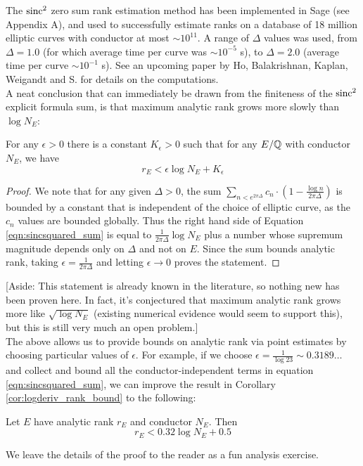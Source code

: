 The $\text{sinc}^2$ zero sum rank estimation method has been implemented in Sage (see Appendix A), and used to successfully estimate ranks on a database of 18 million elliptic curves with conductor at most $\sim 10^{11}$. A range of $\Delta$ values was used, from $\Delta=1.0$ (for which average time per curve was $\sim 10^{-5}$ s), to $\Delta=2.0$ (average time per curve $\sim 10^{-1}$ s). See an upcoming paper by Ho, Balakrishnan, Kaplan, Weigandt and S. for details on the computations. \\

A neat conclusion that can immediately be drawn from the finiteness of the $\text{sinc}^2$ explicit formula sum, is that maximum analytic rank grows more slowly than $\log N_E$:

\begin{corollary}\label{cor:rank_slower_than_log_N}
For any $\epsilon >0$ there is a constant $K_{\epsilon}>0$ such that for any $E/\mathbb{Q}$ with conductor $N_E$, we have
\begin{equation}
r_E < \epsilon \log N_E + K_{\epsilon}
\end{equation}
\end{corollary}
\begin{proof}
We note that for any given $\Delta>0$, the sum $ \sum_{n<e^{2\pi \Delta}} c_n \cdot \left(1-\frac{\log n}{2\pi \Delta}\right)$ is bounded by a constant that is independent of the choice of elliptic curve, as the $c_n$ values are bounded globally. Thus the right hand side of Equation \ref{eqn:sincsquared_sum} is equal to $\frac{1}{2\pi \Delta}\log N_E$ plus a number whose supremum magnitude depends only on $\Delta$ and not on $E$. Since the sum bounds analytic rank, taking $\epsilon = \frac{1}{2\pi \Delta}$ and letting $\epsilon \to 0$ proves the statement.
\end{proof}

[Aside: This statement is already known in the literature, so nothing new has been proven here. In fact, it's conjectured that maximum analytic rank grows more like $\sqrt{\log N_E}$ (existing numerical evidence would seem to support this), but this is still very much an open problem.] \\

The above allows us to provide bounds on analytic rank via point estimates by choosing particular values of $\epsilon$. For example, if we choose $\epsilon = \frac{1}{\log 23} \sim 0.3189\ldots$ and collect and bound all the conductor-independent terms in equation \ref{eqn:sincsquared_sum}, we can improve the result in Corollary \ref{cor:logderiv_rank_bound} to the following:
\begin{corollary}\label{cor:better_an_bound}
Let $E$ have analytic rank $r_E$ and conductor $N_E$. Then
\begin{equation}
r_E < 0.32 \log N_E + 0.5
\end{equation}
\end{corollary}
We leave the details of the proof to the reader as a fun analysis exercise.\\

